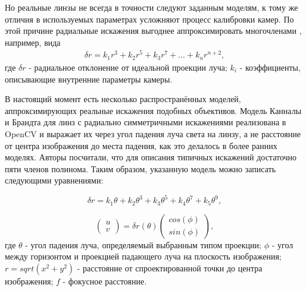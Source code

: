 Но реальные линзы не всегда в точности следуют заданным моделям, к тому же отличия в используемых параметрах усложняют процесс калибровки камер. 
По этой причине радиальные искажения выгоднее аппроксимировать многочленами \cite{opencv_model}, например, вида
 \begin{equation}	
	\begin{split}
        \delta r= k_1 r^3 + k_2 r^5 + k_3 r^7 + ... + k_n r^{n+2},
        \label{eqn:fisheye_distortion}
    \end{split}
\end{equation}
где $\delta r$ - радиальное отклонение от идеальной проекции луча;  $k_i$ - коэффициенты, описывающие внутренние параметры камеры. 


В настоящий момент есть несколько распространённых моделей, аппроксимирующих реальные искажения подобных объективов. Модель Канналы и 
Брандта \cite{opencv_model} для линз с радиально симметричными искажениями реализована в OpenCV и выражает их через угол падения луча света на линзу, а не расстояние  
от центра изображения до места падения, как это делалось в более ранних моделях. Авторы посчитали, что для описания типичных искажений достаточно 
пяти членов полинома. Таким образом, указанную модель можно записать следующими уравнениями:

\begin{equation}	
    \delta r = k_1\theta + k_2\theta^3 + k_3\theta^5 + k_4\theta^7 + k_5\theta^9,
    \label{eqn:kannala_r}
\end{equation}

\begin{equation}	
    \begin{pmatrix}u\\v\end{pmatrix} = \delta r(\theta)\begin{pmatrix}cos(\phi)\\sin(\phi)\end{pmatrix},
    \label{eqn:kannala_uv}
\end{equation}
где $\theta$ - угол падения луча, определяемый выбранным типом проекции; $\phi$ - угол между горизонтом 
и проекцией падающего луча на плоскость изображения; $r = sqrt(x^2+y^2)$ - расстояние от спроектированной точки до центра
изображения; $f$ - фокусное расстояние.

